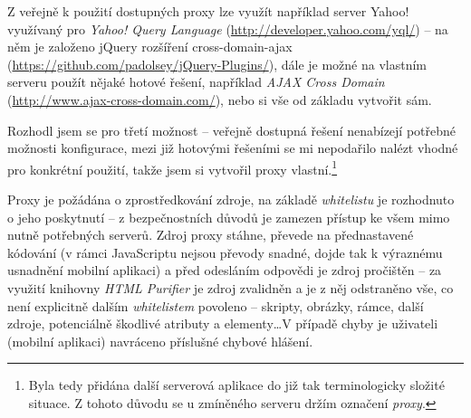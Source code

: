Z veřejně k použití dostupných proxy lze využít například server Yahoo! využívaný pro \textit{Yahoo! Query Language} (\url{http://developer.yahoo.com/yql/}) -- na něm je založeno jQuery rozšíření cross-domain-ajax (\url{https://github.com/padolsey/jQuery-Plugins/}), dále je možné na vlastním serveru použít nějaké hotové řešení, například \textit{AJAX Cross Domain} (\url{http://www.ajax-cross-domain.com/}), nebo si vše od základu vytvořit sám.

Rozhodl jsem se pro třetí možnost -- veřejně dostupná řešení nenabízejí potřebné možnosti konfigurace, mezi již hotovými řešeními se mi nepodařilo nalézt vhodné pro konkrétní použití, takže jsem si vytvořil proxy vlastní.\footnote{Byla tedy přidána další serverová aplikace do již tak terminologicky složité situace. Z tohoto důvodu se u zmíněného serveru držím označení \textit{proxy}.}

Proxy je požádána o zprostředkování zdroje, na základě \textit{whitelistu} je rozhodnuto o jeho poskytnutí -- z bezpečnostních důvodů je zamezen přístup ke všem mimo nutně potřebných serverů. Zdroj proxy stáhne, převede na přednastavené kódování (v rámci JavaScriptu nejsou převody snadné, dojde tak k výraznému usnadnění mobilní aplikaci) a před odesláním odpovědi je zdroj pročištěn -- za využití knihovny \textit{HTML Purifier} je zdroj zvalidněn a je z něj odstraněno vše, co není explicitně dalším \textit{whitelistem} povoleno -- skripty, obrázky, rámce, další zdroje, potenciálně škodlivé atributy a elementy\dots V případě chyby je uživateli (mobilní aplikaci) navráceno příslušné chybové hlášení.

